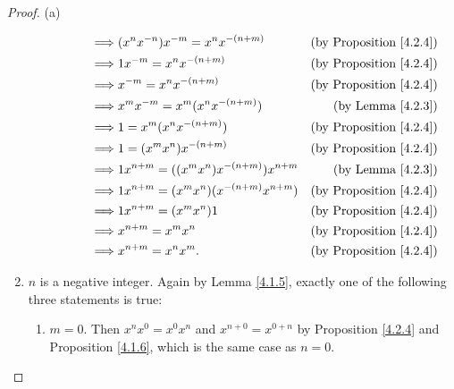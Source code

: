 \begin{proof}{(a)}
\begin{enumerate}[label=(\Roman*)]
\begin{enumerate}[label=(\roman*)]
\begin{enumerate}[label=(\arabic*)]
\begin{align*}
                                      \implies & (x^n x^{-n}) x^{-m} = x^n x^{-(n + m)}                   & \text{(by Proposition \ref{4.2.4})} \\
                                      \implies & 1x^{-m} = x^n x^{-(n + m)}                               & \text{(by Proposition \ref{4.2.4})} \\
                                      \implies & x^{-m} = x^n x^{-(n + m)}                                & \text{(by Proposition \ref{4.2.4})} \\
                                      \implies & x^m x^{-m} = x^m (x^n x^{-(n + m)})                      & \text{(by Lemma \ref{4.2.3})}       \\
                                      \implies & 1 = x^m (x^n x^{-(n + m)})                               & \text{(by Proposition \ref{4.2.4})} \\
                                      \implies & 1 = (x^m x^n) x^{-(n + m)}                               & \text{(by Proposition \ref{4.2.4})} \\
                                      \implies & 1x^{n + m} = ((x^m x^n) x^{-(n + m)}) x^{n + m}          & \text{(by Lemma \ref{4.2.3})}       \\
                                      \implies & 1x^{n + m} = (x^m x^n)(x^{-(n + m)} x^{n + m})           & \text{(by Proposition \ref{4.2.4})} \\
                                      \implies & 1x^{n + m} = (x^m x^n)1                                  & \text{(by Proposition \ref{4.2.4})} \\
                                      \implies & x^{n + m} = x^m x^n                                      & \text{(by Proposition \ref{4.2.4})} \\
                                      \implies & x^{n + m} = x^n x^m.                                     & \text{(by Proposition \ref{4.2.4})}
                                  \end{align*}
                        \end{enumerate}
              \end{enumerate}
        \item \(n\) is a negative integer.
              Again by Lemma \ref{4.1.5}, exactly one of the following three statements is true:
              \begin{enumerate}[label=(\roman*)]
                  \item \(m = 0\).
                        Then \(x^n x^0 = x^0 x^n\) and \(x^{n + 0} = x^{0 + n}\) by Proposition \ref{4.2.4} and Proposition \ref{4.1.6}, which is the same case as \(n = 0\).

\end{enumerate}
\end{enumerate}
\end{proof}
